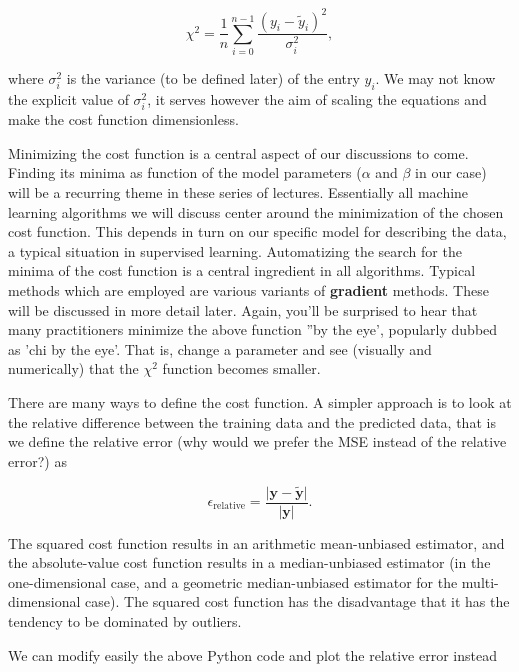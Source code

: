 \documentclass{beamer}
\begin{document}
\begin{frame}
\[ \chi^2 = \frac{1}{n}
\sum_{i=0}^{n-1}\frac{(y_i-\tilde{y}_i)^2}{\sigma_i^2}, 
\] 

where $\sigma_i^2$ is the variance (to be defined later) of the entry
$y_i$.  We may not know the explicit value of $\sigma_i^2$, it serves
however the aim of scaling the equations and make the cost function
dimensionless.  

Minimizing the cost function is a central aspect of
our discussions to come. Finding its minima as function of the model
parameters ($\alpha$ and $\beta$ in our case) will be a recurring
theme in these series of lectures. Essentially all machine learning
algorithms we will discuss center around the minimization of the
chosen cost function. This depends in turn on our specific
model for describing the data, a typical situation in supervised
learning. Automatizing the search for the minima of the cost function is a
central ingredient in all algorithms. Typical methods which are
employed are various variants of \textbf{gradient} methods. These will be
discussed in more detail later. Again, you'll be surprised to hear that
many practitioners minimize the above function ''by the eye', popularly dubbed as 
'chi by the eye'. That is, change a parameter and see (visually and numerically) that 
the  $\chi^2$ function becomes smaller. 

There are many ways to define the cost function. A simpler approach is to look at the relative difference between the training data and the predicted data, that is we define 
the relative error (why would we prefer the MSE instead of the relative error?) as

\[
\epsilon_{\mathrm{relative}}= \frac{\vert \bm{y} -\bm{\tilde{y}}\vert}{\vert \bm{y}\vert}.
\]

The squared cost function results in an arithmetic mean-unbiased
estimator, and the absolute-value cost function results in a
median-unbiased estimator (in the one-dimensional case, and a
geometric median-unbiased estimator for the multi-dimensional
case). The squared cost function has the disadvantage that it has the tendency
to be dominated by outliers.

We can modify easily the above Python code and plot the relative error instead


















\end{frame}
\end{document}
